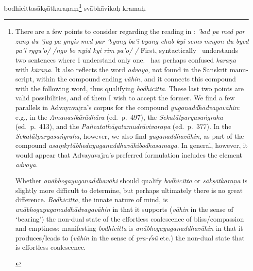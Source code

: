 \documentclass[naipra.tex]{subfiles}
\begin{document}
\begin{sanskrit}


\pstart
{} bodhicittasākṣātkaraṇaṃ\footnote{
	\begin{english}%
		There are a few points to consider regarding the reading in \TIB : \emph{'bad pa med par zung du 'jug pa gnyis med par 'byung ba'i byang chub kyi sems mngon du byed pa'i rgyu'o/ /ngo bo nyid kyi rim pa'o/ /}
		First, syntactically \TIB\ understands two sentences where I understand only one. 
		\TIB\ has perhaps confused \emph{karaṇa} with \emph{kāraṇa}.
		It also reflects the word \emph{advaya}, not found in the Sanskrit manuscript, within the compound ending \emph{vāhin}, and it connects this compound with the following word, thus qualifying \emph{bodhicitta}.
		These last two points are valid possibilities, and of them I wish to accept the former.
		We find a few parallels in Advayavajra's corpus for the compound \emph{yuganaddhādvayavāhin}: e.g., in the \emph{Amanasikārādhāra} (ed.\ p.\ 497), the \emph{Sekatātparyasaṅgraha} (ed.\ p.\ 413), and the \emph{Pañcatathāgatamudrāvivaraṇa} (ed.\ p.\ 377). 
		In the \emph{Sekatātparyasaṅgraha}, however, we also find \emph{yuganaddhavāhin}, as part of the compound \emph{asaṃkṛtābhedayuganaddhavāhibodhasamaya}.
		In general, however, it would appear that Advayavajra's preferred formulation includes the element \emph{advaya}.

		Whether \emph{anābhogayuganaddhavāhi} should qualify \emph{bodhicitta} or \emph{sākṣātkaraṇa} is slightly more difficult to determine, but perhaps ultimately there is no great difference.
		\emph{Bodhicitta}, the innate nature of mind, is \emph{anābhogayuganaddhādvayavāhin} in that it supports (\emph{vāhin} in the sense of `bearing') the non-dual state of the effortless coalescence of bliss/compassion and emptiness; manifesting \emph{bodhicitta} is \emph{anābhogayuganaddhavāhin} in that it produces/leads to (\emph{vāhin} in the sense of \emph{pra-√sū} etc.) the non-dual state that is effortless coalescence.%
	\end{english}
} svābhāvikaḥ kramaḥ. 
\pend


\end{sanskrit}
\end{document}
